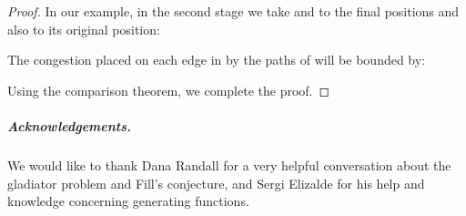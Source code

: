 \documentclass[10 pt]{article}
\begin{document}
\begin{proof}
In our example, in the second stage we take  and  to the final positions and also  to its original position:


\smallskip

 

\medskip

The congestion placed on each edge in  by the paths of  will be bounded by:







 






Using the comparison theorem, we complete the proof.


\end{proof}
\subparagraph*{Acknowledgements.}


We would like to thank Dana Randall for a very helpful conversation about the gladiator problem and Fill's conjecture,
and Sergi Elizalde for his help and knowledge concerning generating functions.  
\end{document}
